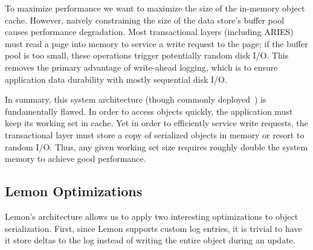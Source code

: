\documentclass[10pt,letterpaper,twocolumn,english]{article}
\newcommand{\yad}{Lemon\xspace}
\begin{document}
To maximize performance we want to maximize the size of the in-memory object cache.
However, naively constraining the size of the data store's buffer pool
causes performance degradation. Most transactional layers 
(including ARIES) must read a page
into memory to service a write request to the page; if the buffer pool
is too small, these operations trigger potentially random disk I/O. 
This removes the primary
advantage of write-ahead logging, which is to ensure application data
durability with mostly sequential disk I/O.

In summary, this system architecture (though commonly
deployed~\cite{hibernate,postgres}) is fundamentally
flawed.  In order to access objects quickly, the application must keep
its working set in cache.  Yet in order to efficiently service write 
requests, the
transactional layer must store a copy of serialized objects
in memory or resort to random I/O.  
Thus, any given working set size requires roughly double the system
memory to achieve good performance.

\subsection{\yad Optimizations}

\label{version-pages}

\yad's architecture allows us to apply two interesting optimizations
to object serialization.  First, since \yad supports
custom log entries, it is trivial to have it store deltas to
the log instead of writing the entire object during an update.


\end{document}
